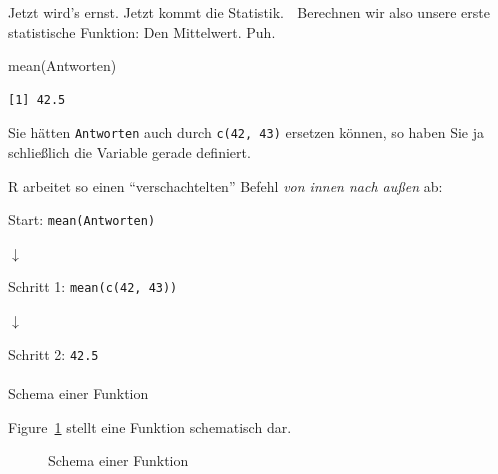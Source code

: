 \documentclass[
  letterpaper,
  DIV=11,
  numbers=noendperiod]{scrartcl}
\makeatletter
\let\oldparagraph\paragraph
\renewcommand{\paragraph}{
    \@ifstar
      \xxxParagraphStar
      \xxxParagraphNoStar
  }
\newcommand{\xxxParagraphStar}[1]{\oldparagraph*{#1}\mbox{}}
\newcommand{\xxxParagraphNoStar}[1]{\oldparagraph{#1}\mbox{}}
\newenvironment{Shaded}{\begin{snugshade}}{\end{snugshade}}
\newcommand{\FunctionTok}[1]{\textcolor[rgb]{0.28,0.35,0.67}{#1}}
\newcommand{\NormalTok}[1]{\textcolor[rgb]{0.00,0.23,0.31}{#1}}
\theoremstyle{definition}
\theoremstyle{definition}
\theoremstyle{definition}
\theoremstyle{remark}
\makeatother
\begin{document}
Jetzt wird's ernst. Jetzt kommt die Statistik. 🧟 Berechnen wir also
unsere erste statistische Funktion: Den Mittelwert. Puh.

\begin{Shaded}
\begin{Highlighting}[]
\FunctionTok{mean}\NormalTok{(Antworten)}
\end{Highlighting}
\end{Shaded}

\begin{verbatim}
[1] 42.5
\end{verbatim}

Sie hätten \texttt{Antworten} auch durch \texttt{c(42,\ 43)} ersetzen
können, so haben Sie ja schließlich die Variable gerade definiert.

R arbeitet so einen ``verschachtelten'' Befehl \emph{von innen nach
außen} ab:

Start: \texttt{mean(Antworten)}

{\(\downarrow\)}

Schritt 1: \texttt{mean(c(42,\ 43))}

{\(\downarrow\)}

Schritt 2: \texttt{42.5}

\paragraph{Schema einer Funktion}\label{schema-einer-funktion}

Figure~\ref{fig-function-schema} stellt eine Funktion schematisch dar.

\begin{figure}


\caption{\label{fig-function-schema}Schema einer Funktion}

\end{figure}%
\end{document}
